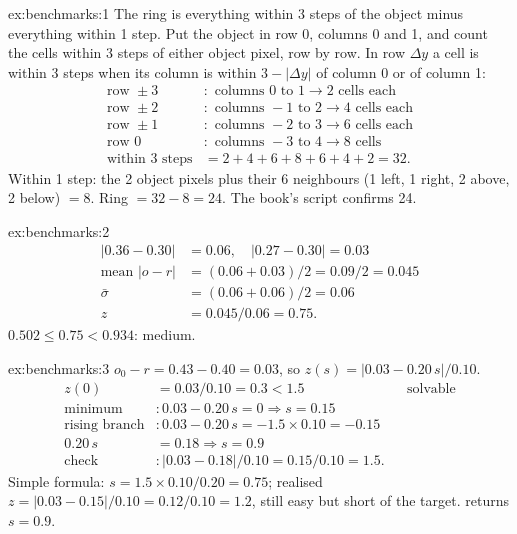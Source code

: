 
\begin{solution}{ex:benchmarks:1}
The ring is everything within 3 steps of the object minus everything within 1 step. Put the object in row 0, columns 0
and 1, and count the cells within 3 steps of either object pixel, row by row. In row $\Delta y$ a cell is within 3 steps
when its column is within $3 - |\Delta y|$ of column 0 or of column 1:
\begin{align*}
\text{row } \pm3&: \text{ columns } 0 \text{ to } 1 \to 2 \text{ cells each}\\
\text{row } \pm2&: \text{ columns } -1 \text{ to } 2 \to 4 \text{ cells each}\\
\text{row } \pm1&: \text{ columns } -2 \text{ to } 3 \to 6 \text{ cells each}\\
\text{row } 0&: \text{ columns } -3 \text{ to } 4 \to 8 \text{ cells}\\
\text{within 3 steps} &= 2 + 4 + 6 + 8 + 6 + 4 + 2 = 32.
\end{align*}
Within 1 step: the 2 object pixels plus their 6 neighbours (1 left, 1 right, 2 above, 2 below) $= 8$.
Ring $= 32 - 8 = 24$. The book's script confirms 24.
\end{solution}

\begin{solution}{ex:benchmarks:2}
\begin{align*}
|0.36 - 0.30| &= 0.06, \quad |0.27 - 0.30| = 0.03\\
\text{mean } |o - r| &= (0.06 + 0.03)/2 = 0.09/2 = 0.045\\
\bar\sigma &= (0.06 + 0.06)/2 = 0.06\\
z &= 0.045 / 0.06 = 0.75.
\end{align*}
$0.502 \le 0.75 < 0.934$: medium.
\end{solution}

\begin{solution}{ex:benchmarks:3}
$o_0 - r = 0.43 - 0.40 = 0.03$, so $z(s) = |0.03 - 0.20\,s| / 0.10$.
\begin{align*}
z(0) &= 0.03 / 0.10 = 0.3 < 1.5 && \text{solvable}\\
\text{minimum} &: 0.03 - 0.20\,s = 0 \Rightarrow s = 0.15\\
\text{rising branch} &: 0.03 - 0.20\,s = -1.5 \times 0.10 = -0.15\\
0.20\,s &= 0.18 \Rightarrow s = 0.9\\
\text{check} &: |0.03 - 0.18| / 0.10 = 0.15 / 0.10 = 1.5.
\end{align*}
Simple formula: $s = 1.5 \times 0.10 / 0.20 = 0.75$; realised $z = |0.03 - 0.15| / 0.10 = 0.12 / 0.10 = 1.2$, still
easy but short of the target.  returns $s = 0.9$.
\end{solution}

